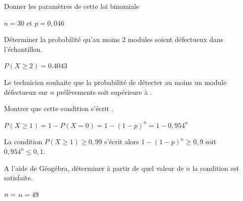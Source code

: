 \begin{enumerate}[series=monDS, resume]

\begin{minipage}{0.47\textwidth}
        \item Donner les paramètres de cette loi binomiale
\end{minipage}\hfill{}
\begin{minipage}{0.47\textwidth}
    \begin{blocvisiblex}[height=1]
    {\quad}
    $n=30$ et $p=0,046$
    \end{blocvisiblex}
\end{minipage}


\begin{minipage}{0.47\textwidth}
    \bigskip
    \item Déterminer la probabilité qu'au moins 2 modules soient défectueux dans l'échantillon.
\end{minipage}\hfill{}
\begin{minipage}{0.47\textwidth}
    \begin{blocvisiblex}[height=1]
    {\quad}
    $P(X\geq 2)= 0.4043$
    \end{blocvisiblex}
\end{minipage}
\end{enumerate}

\pagebreak
Le technicien souhaite que la probabilité de détecter au moins un module défectueux sur $n$ prélèvements soit supérieure à .

\begin{enumerate}[series=monDS, resume]
    \item Montrer que cette condition s'écrit .
    \begin{blocvisiblex}[height=3]
    {\quad}
    $P(X\geq 1)=1-P(X=0)=1-{(1-p)}^n=1-{0,954}^n$

    La condition $P(X\geq 1)\geq0,99$ s'écrit alors $1-{(1-p)}^n\geq 0,9$ soit ${0,954}^n \leq 0,1$.
    \end{blocvisiblex}
    \medskip
    \begin{minipage}{0.50\textwidth}
    \item A l'aide de Géogébra, déterminer à partir de quel valeur de $n$ la condition est satisfaite.
\end{minipage}\hfill{}
\begin{minipage}{0.43\textwidth}
    \begin{blocvisiblex}[height=1]
    {$n=\dotfill$}
    $n= 49$
    \end{blocvisiblex}
\end{minipage}

    \appelprof{}
\end{enumerate}

